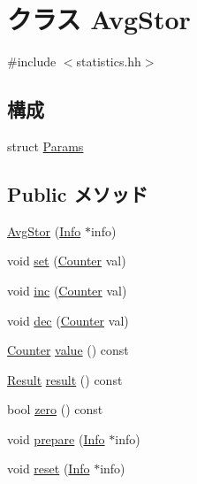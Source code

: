 \hypertarget{classStats_1_1AvgStor}{
\section{クラス AvgStor}
\label{classStats_1_1AvgStor}
}


{\ttfamily \#include $<$statistics.hh$>$}\subsection*{構成}
\begin{DoxyCompactItemize}
\item 
struct \hyperlink{structStats_1_1AvgStor_1_1Params}{Params}
\end{DoxyCompactItemize}
\subsection*{Public メソッド}
\begin{DoxyCompactItemize}
\item 
\hyperlink{classStats_1_1AvgStor_aff27955b5798abace5a5f0aef2421772}{AvgStor} (\hyperlink{classStats_1_1Info}{Info} $\ast$info)
\item 
void \hyperlink{classStats_1_1AvgStor_a7687ba04921eb09ab374fb40c4e1eb9d}{set} (\hyperlink{namespaceStats_ac35128c026c72bb36af9cea00774e8a6}{Counter} val)
\item 
void \hyperlink{classStats_1_1AvgStor_a8e52de5dde7b3cab8328c91dbbb1f229}{inc} (\hyperlink{namespaceStats_ac35128c026c72bb36af9cea00774e8a6}{Counter} val)
\item 
void \hyperlink{classStats_1_1AvgStor_a89d7b0cf8f0932a96f6728d61d5818b1}{dec} (\hyperlink{namespaceStats_ac35128c026c72bb36af9cea00774e8a6}{Counter} val)
\item 
\hyperlink{namespaceStats_ac35128c026c72bb36af9cea00774e8a6}{Counter} \hyperlink{classStats_1_1AvgStor_aa9e486cb7eb0ad44f5f89923594b68a4}{value} () const 
\item 
\hyperlink{namespaceStats_ad874d2cfd4b4a29ebd480bb2e67f20ae}{Result} \hyperlink{classStats_1_1AvgStor_ae050da86c3d8e8a677a0bdeb7971e1e3}{result} () const 
\item 
bool \hyperlink{classStats_1_1AvgStor_a4e72b01b727d3165e75cba84eb507491}{zero} () const 
\item 
void \hyperlink{classStats_1_1AvgStor_a496667796a30696e960f80f4e3d69e69}{prepare} (\hyperlink{classStats_1_1Info}{Info} $\ast$info)
\item 
void \hyperlink{classStats_1_1AvgStor_a10d9d71be6e0d2194999bb5dd5280e2d}{reset} (\hyperlink{classStats_1_1Info}{Info} $\ast$info)
\end{DoxyCompactItemize}
